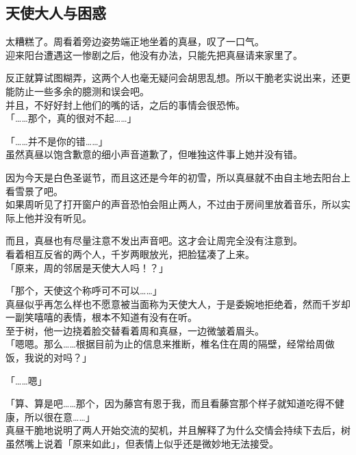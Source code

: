 \subsection{天使大人与困惑}

太糟糕了。周看着旁边姿势端正地坐着的真昼，叹了一口气。\\

迎来阳台遭遇这一惨剧之后，他没有办法，只能先把真昼请来家里了。

反正就算试图糊弄，这两个人也毫无疑问会胡思乱想。所以干脆老实说出来，还更能防止一些多余的臆测和误会吧。\\

并且，不好好封上他们的嘴的话，之后的事情会很恐怖。\\

「……那个，真的很对不起……」

「……并不是你的错……」\\

虽然真昼以饱含歉意的细小声音道歉了，但唯独这件事上她并没有错。

因为今天是白色圣诞节，而且这还是今年的初雪，所以真昼就不由自主地去阳台上看雪景了吧。\\

如果周听见了打开窗户的声音恐怕会阻止两人，不过由于房间里放着音乐，所以实际上他并没有听见。

而且，真昼也有尽量注意不发出声音吧。这才会让周完全没有注意到。\\

看着相互反省的两个人，千岁两眼放光，把脸猛凑了上来。\\

「原来，周的邻居是天使大人吗！？」

「那个，天使这个称呼可不可以……」\\

真昼似乎再怎么样也不愿意被当面称为天使大人，于是委婉地拒绝着，然而千岁却一副笑嘻嘻的表情，根本不知道有没有在听。\\

至于树，他一边挠着脸交替看着周和真昼，一边微皱着眉头。\\

「嗯嗯。那么……根据目前为止的信息来推断，椎名住在周的隔壁，经常给周做饭，我说的对吗？」

「……嗯」

「算、算是吧……那个，因为藤宫有恩于我，而且看藤宫那个样子就知道吃得不健康，所以很在意……」\\

真昼干脆地说明了两人开始交流的契机，并且解释了为什么交情会持续下去后，树虽然嘴上说着「原来如此」，但表情上似乎还是微妙地无法接受。\\

